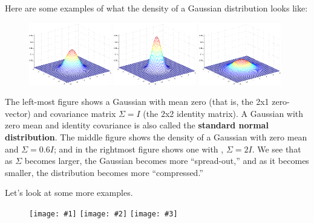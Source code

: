 \documentclass{article}
\newcommand{\threefigures}[3]{
	\begin{figure}[H]
		\texttt{[image: \#1]}
		\texttt{[image: \#2]}
		\texttt{[image: \#3]}
	\end{figure}
}
\begin{document}
Here are some examples of what the density of a Gaussian distribution looks like:

\begin{figure}[h]
\includegraphics[width=0.32\textwidth]{gaussian_1_0_1.eps}
\includegraphics[width=0.32\textwidth]{gaussian_0-6_0_0-6.eps}
\includegraphics[width=0.32\textwidth]{gaussian_2_0_2.eps}
\end{figure}


The left-most figure shows a Gaussian with mean zero (that is, the 2x1 zero-vector) and covariance matrix
$\Sigma = I$ (the 2x2 identity matrix).  A Gaussian with zero mean and identity covariance is
also called the {\bf standard normal distribution}.
The middle figure shows the density of a Gaussian with zero mean and $\Sigma = 0.6 I$; and in
the rightmost figure shows one with , $\Sigma = 2I$.  We see that as $\Sigma$ becomes larger,
the Gaussian becomes more ``spread-out,'' and as it becomes smaller, the distribution becomes
more ``compressed.''

Let's look at some more examples.


\threefigures{gaussian_1_0_1b.eps}{gaussian_1_0-5_1b.eps}{gaussian_1_0-8_1b.eps}
\end{document}
